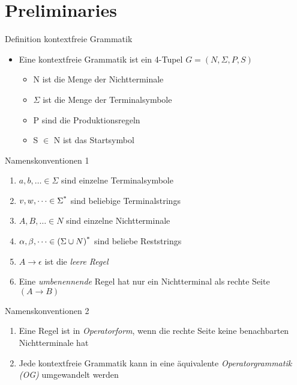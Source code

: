 \documentclass[
10pt,
pantone315, 	%
]{beamer}
\begin{document}
\section{Preliminaries}
\begin{frame}[t]{Definition kontextfreie Grammatik}
	\begin{itemize}[<+->]
		\item
		Eine kontextfreie Grammatik ist ein 4-Tupel $G = (N, \Sigma , P, S)$
		\begin{itemize}[<+->]
			\item
			N ist die Menge der Nichtterminale
			\item
			$\Sigma$ ist die Menge der Terminalsymbole
			\item
			P sind die Produktionsregeln
			\item
			S $\in$ N ist das Startsymbol
		\end{itemize}
	\end{itemize}
\end{frame}
\begin{frame}[t]{Namenskonventionen 1}
	\begin{enumerate}
		\item
		$a,b,\dots\in\Sigma$ sind einzelne Terminalsymbole
		\item 
		$v,w,\dots\in\Sigma\textsuperscript{*}$ sind beliebige Terminalstrings
		\item
		$A,B,\dots\in N$ sind einzelne Nichtterminale
		\item
		$\alpha,\beta,\dots\in (\Sigma \cup N)\textsuperscript{*}$ sind beliebe Reststrings
		\item
		$A \rightarrow \epsilon $ ist die \textit{leere Regel}
		\item
		Eine \textit{umbenennende} Regel hat nur ein Nichtterminal als rechte Seite $\left( A \rightarrow B \right)$
	\end{enumerate}
\end{frame}

\begin{frame}[t]{Namenskonventionen 2}
	\begin{enumerate}
		\item
		Eine Regel ist in \textit{Operatorform}, wenn die rechte Seite keine benachbarten Nichtterminale hat
		\item 
		Jede kontextfreie Grammatik kann in eine äquivalente \textit{Operatorgrammatik (OG)} umgewandelt werden
		
	\end{enumerate}
\end{frame}
\end{document}
